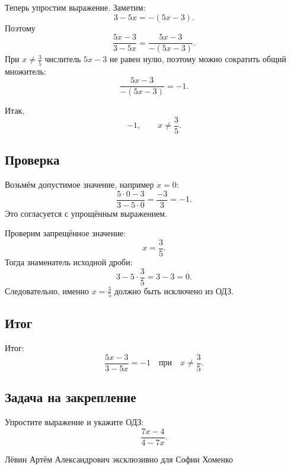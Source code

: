 \documentclass[12pt,a4paper]{article}
\begin{document}
Теперь упростим выражение. Заметим:
\[
3-5x=-(5x-3).
\]
Поэтому
\[
\frac{5x-3}{3-5x}
=
\frac{5x-3}{-(5x-3)}.
\]
При $x\ne\frac35$ числитель $5x-3$ не равен нулю, поэтому можно сократить общий множитель:
\[
\frac{5x-3}{-(5x-3)}=-1.
\]

Итак,
\[
\boxed{-1,\qquad x\ne\frac35}.
\]

\subsection*{Проверка}
Возьмём допустимое значение, например $x=0$:
\[
\frac{5\cdot0-3}{3-5\cdot0}
=
\frac{-3}{3}
=
-1.
\]
Это согласуется с упрощённым выражением.

Проверим запрещённое значение:
\[
x=\frac35.
\]
Тогда знаменатель исходной дроби:
\[
3-5\cdot\frac35=3-3=0.
\]
Следовательно, именно $x=\frac35$ должно быть исключено из ОДЗ.

\subsection*{Итог}
\textcolor{teal!60!black}{Итог:}
\[
\frac{5x-3}{3-5x}=-1
\quad\text{при}\quad
x\ne\frac35.
\]

\subsection*{Задача на закрепление}
Упростите выражение и укажите ОДЗ:
\[
\frac{7x-4}{4-7x}.
\]

\vfill
\begin{center}
\small Лёвин Артём Александрович эксклюзивно для Софии Хоменко
\end{center}
\end{document}
